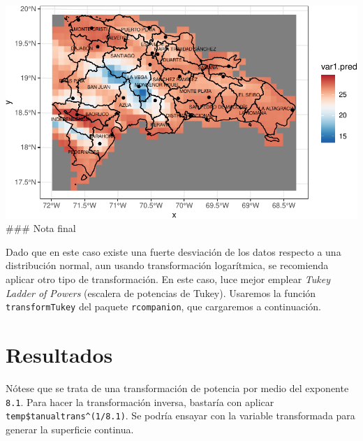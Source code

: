 \documentclass[11pt,]{article}
\newenvironment{Shaded}{\begin{snugshade}}{\end{snugshade}}
\newcommand{\KeywordTok}[1]{\textcolor[rgb]{0.13,0.29,0.53}{\textbf{#1}}}
\newcommand{\DataTypeTok}[1]{\textcolor[rgb]{0.13,0.29,0.53}{#1}}
\newcommand{\StringTok}[1]{\textcolor[rgb]{0.31,0.60,0.02}{#1}}
\newcommand{\OperatorTok}[1]{\textcolor[rgb]{0.81,0.36,0.00}{\textbf{#1}}}
\newcommand{\NormalTok}[1]{#1}
\begin{document}
\includegraphics{proyecto_files/figure-latex/krige-uk-1.pdf} \#\#\# Nota
final

Dado que en este caso existe una fuerte desviación de los datos respecto
a una distribución normal, aun usando transformación logarítmica, se
recomienda aplicar otro tipo de transformación. En este caso, luce mejor
emplear \emph{Tukey Ladder of Powers} (escalera de potencias de Tukey).
Usaremos la función \texttt{transformTukey} del paquete
\texttt{rcompanion}, que cargaremos a continuación.

\begin{Shaded}
\end{Shaded}

\section{Resultados}\label{resultados}

Nótese que se trata de una transformación de potencia por medio del
exponente \texttt{8.1}. Para hacer la transformación inversa, bastaría
con aplicar \texttt{temp\$tanualtrans\^{}(1/8.1)}. Se podría ensayar con
la variable transformada para generar la superficie continua.
\end{document}

